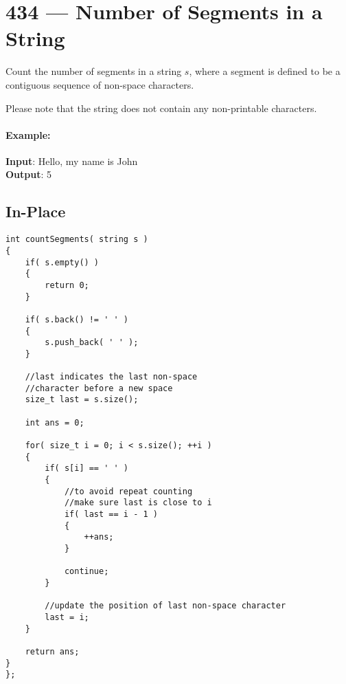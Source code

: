\section{434 --- Number of Segments in a String}
Count the number of segments in a string $s$, where a segment is defined to be a contiguous sequence of non-space characters.

Please note that the string does not contain any non-printable characters.

\paragraph{Example:}

\begin{flushleft}
\textbf{Input}: Hello, my name is John
\\
\textbf{Output}: 5
\end{flushleft}

\subsection{In-Place}

\setcounter{lstlisting}{0}
\begin{lstlisting}[style=customc, caption={In-place}]
int countSegments( string s )
{
    if( s.empty() )
    {
        return 0;
    }

    if( s.back() != ' ' )
    {
        s.push_back( ' ' );
    }

    //last indicates the last non-space
    //character before a new space
    size_t last = s.size();

    int ans = 0;

    for( size_t i = 0; i < s.size(); ++i )
    {
        if( s[i] == ' ' )
        {
            //to avoid repeat counting
            //make sure last is close to i
            if( last == i - 1 )
            {
                ++ans;
            }

            continue;
        }

        //update the position of last non-space character
        last = i;
    }

    return ans;
}
};
\end{lstlisting}